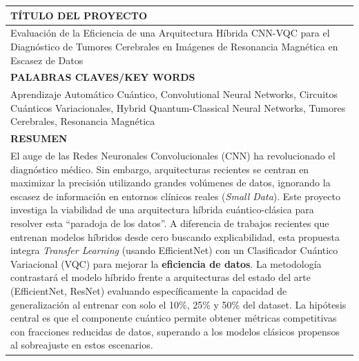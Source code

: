 \documentclass[12pt,letterpaper]{article}
\begin{document}
    \begin{longtable}{|p{\dimexpr\textwidth-2\tabcolsep-2\arrayrulewidth}|}
        \hline
        \rowcolor{lightgray}\centering\arraybackslash\textbf{TÍTULO DEL PROYECTO} \\\hline
        Evaluación de la Eficiencia de una Arquitectura Híbrida CNN-VQC para el Diagnóstico de Tumores Cerebrales en Imágenes de Resonancia Magnética en Escasez de Datos
        \\\hline
        \rowcolor{lightgray}\centering\arraybackslash\textbf{PALABRAS CLAVES/KEY WORDS} \\\hline
        Aprendizaje Automático Cuántico,  Convolutional Neural Networks, Circuitos Cuánticos Variacionales, Hybrid Quantum-Classical Neural Networks, Tumores Cerebrales, Resonancia Magnética \\\hline
        \rowcolor{lightgray}\centering\arraybackslash\textbf{RESUMEN} \\\hline
        El auge de las Redes Neuronales Convolucionales (CNN) ha revolucionado el diagnóstico médico. Sin embargo, arquitecturas recientes se centran en maximizar la precisión utilizando grandes volúmenes de datos, ignorando la escasez de información en entornos clínicos reales (\textit{Small Data}).
        Este proyecto investiga la viabilidad de una arquitectura híbrida cuántico-clásica para resolver esta ``paradoja de los datos''.
        A diferencia de trabajos recientes que entrenan modelos híbridos desde cero buscando explicabilidad, esta propuesta integra \textit{Transfer Learning} (usando EfficientNet) con un Clasificador Cuántico Variacional (VQC) para mejorar la \textbf{eficiencia de datos}.
        La metodología contrastará el modelo híbrido frente a arquitecturas del estado del arte (EfficientNet, ResNet) evaluando específicamente la capacidad de generalización al entrenar con solo el 10\%, 25\% y 50\% del dataset.
        La hipótesis central es que el componente cuántico permite obtener métricas competitivas con fracciones reducidas de datos, superando a los modelos clásicos propensos al sobreajuste en estos escenarios.
        \\\hline
    \end{longtable}
    \setcounter{table}{0}

    \hypersetup{pageanchor=false}
\end{document}
